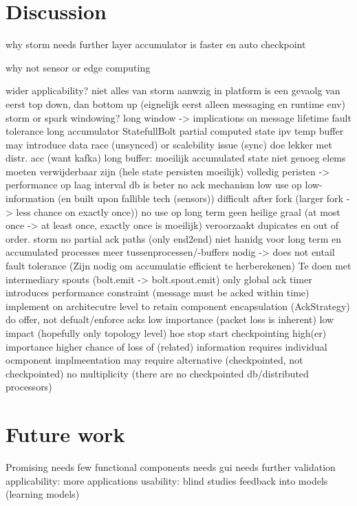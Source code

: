 \section{Discussion}
\label{sec:conclusion:discussion}
why storm needs further layer
	accumulator is faster en auto checkpoint
	
why not sensor or edge computing

wider applicability?
niet alles van storm aanwzig in platform
	is een gevaolg van eerst top down, dan bottom up 
	(eignelijk eerst alleen messaging en runtime env)
storm or spark windowing?
	long window -> implications on message lifetime
fault tolerance
	long accumulator StatefullBolt	
		partial computed state ipv temp buffer
		may introduce data race (unsynced) or scalebility issue (sync)
		doe lekker met distr. acc (want kafka)
	long buffer: moeilijk
		accumulated state niet genoeg
		elems moeten verwijderbaar zijn (hele state persisten moeilijk)
		volledig peristen -> performance op laag interval
		db is beter
	no ack mechanism 
		low use op low-information (en built upon fallible tech (sensors))
		difficult after fork (larger fork -> less chance on exactly once))
		no use op long term
		geen heilige graal (at most once -> at least once, exactly once is moeilijk)
			veroorzaakt dupicates en out of order.
		storm no partial ack paths (only end2end)
			niet hanidg voor long term en accumulated processes
				meer tussenprocessen/-buffers nodig -> does not entail fault tolerance
			(Zijn nodig om accumulatie efficient te herberekenen)
			Te doen met intermediary spouts (bolt.emit -> bolt.spout.emit)
		only global ack timer
			introduces performance constraint (message must be acked within time)
		implement on architecutre level to retain component encapsulation (AckStrategy)
		do offer, not defualt/enforce
	acks
		low importance (packet loss is inherent)
		low impact (hopefully only topology level)
		hoe stop start
	checkpointing
		high(er) importance higher chance of loss of (related) information
		requires individual ocmponent implmeentation
		may require alternative (checkpointed, not checkpointed)
			no multiplicity (there are no checkpointed db/distributed processors)
	
\section{Future work}
Promising
needs few functional components
needs gui
needs further validation
	applicability: more applications
	usability: blind studies
feedback into models (learning models)
